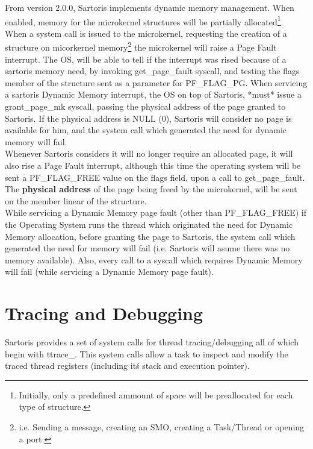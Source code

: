 \documentclass[11pt, letterpaper, twoside, english]{book}
\begin{document}
From version \textsf{2.0.0}, Sartoris implements dynamic memory management. When enabled, memory for the microkernel structures will be partially allocated\footnote{Initially, only a predefined ammount of space will be preallocated for each type of structure.}.\\

When a system call is issued to the microkernel, requesting the creation of a structure on micorkernel memory\footnote{i.e. Sending a message, creating an SMO, creating a Task/Thread or opening a port.} the microkernel will raise a Page Fault interrupt. The OS, will be able to tell if the interrupt was rised because of a sartoris memory need, by invoking \textsf{get\_page\_fault} syscall, and testing the flags member of the structure sent as a parameter for \textsf{PF\_FLAG\_PG}. When servicing a sartoris Dynamic Memory interrupt, the OS on top of Sartoris, *must* issue a \textsf{grant\_page\_mk} syscall, passing the physical address of the page granted to Sartoris. If the physical address is NULL (0), Sartoris will consider no page is available for him, and the system call which generated the need for dynamic memory will fail.\\ 
Whenever Sartoris considers it will no longer require an allocated page, it will also rise a Page Fault interrupt, although this time the operating system will be sent a \textsf{PF\_FLAG\_FREE} value on the \textsf{flags} field, upon a call to \textsf{get\_page\_fault}. The \textbf{physical address} of the page being freed by the microkernel, will be sent on the member \textsf{linear} of the structure.\\

While servicing a Dynamic Memory page fault (other than \textsf{PF\_FLAG\_FREE}) if the Operating System runs the thread which originated the need for Dynamic Memory allocation, before granting the page to Sartoris, the system call which generated the need for memory will fail (i.e. Sartoris will asume there was no memory available). Also, every call to a syscall which requires Dynamic Memory will fail (while servicing a Dynamic Memory page fault).

\section{Tracing and Debugging} \label{sec:tracing}

Sartoris provides a set of system calls for thread tracing/debugging all of which begin with \textsf{ttrace\_}. This system calls allow a task to inspect and modify the traced thread registers (including it\'s stack and execution pointer).\\
\end{document}
